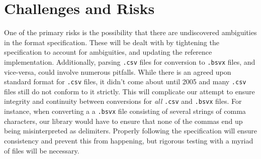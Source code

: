 \documentclass[10pt]{article}
\begin{document}
\begin{table}[htp]
\centering
{}
\caption{Purported project schedule.}
\label{tab:approach_schedule}
\end{table}

\section*{Challenges and Risks}

One of the primary risks is the possibility that there are undiscovered ambiguities in the format specification.
These will be dealt with by tightening the specification to account for ambiguities, and updating the reference implementation.
Additionally, parsing \texttt{.csv} files for conversion to \texttt{.bsvx} files, and vice-versa, could involve numerous pitfalls.
While there is an agreed upon standard format for \texttt{.csv} files, it didn’t come about until 2005 and many \texttt{.csv} files still do not conform to it strictly.
This will complicate our attempt to ensure integrity and continuity between conversions for \textit{all} \texttt{.csv} and \texttt{.bsvx} files.
For instance, when converting a a \texttt{.bsvx} file consisting of several strings of comma characters, our library would have to ensure that none of the commas end up being misinterpreted as delimiters.
Properly following the specification will ensure consistency and prevent this from happening, but rigorous testing with a myriad of files will be necessary.
\end{document}
